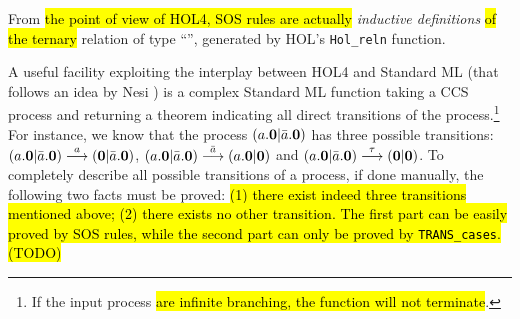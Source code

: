 From \hl{the point of view of HOL4, SOS rules are actually} \emph{inductive
  definitions} \hl{of the ternary} relation  of type ``'', generated by HOL's
\texttt{Hol_reln} function.

A useful facility exploiting the interplay
between HOL4 and Standard ML (that follows an idea by Nesi \cite{Nesi:1992ve})
 is a complex Standard ML function
  taking a CCS process and returning a theorem indicating all
  direct transitions of the process.\footnote{If the input process \hl{are
 infinite branching, the function will not terminate}.}
For instance, we know that the process $(a.{\boldsymbol 0} | \bar{a}.{\boldsymbol 0})$ has three
possible transitions: $(a.{\boldsymbol 0} | \bar{a}.{\boldsymbol 0}) \overset{a}{\longrightarrow}
({\boldsymbol 0} | \bar{a}.{\boldsymbol 0})$, $(a.{\boldsymbol 0} | \bar{a}.{\boldsymbol 0})
\overset{\bar{a}}{\longrightarrow} (a.{\boldsymbol 0} | {\boldsymbol 0})$ and $(a.{\boldsymbol 0} | \bar{a}.{\boldsymbol 0})
\overset{\tau}{\longrightarrow} ({\boldsymbol 0} | {\boldsymbol 0})$.
To completely describe all possible transitions of a process, if done manually, the
following two facts must be proved: \hl{(1) there exist indeed three
  transitions mentioned above; (2) there exists no other
  transition. The first part can be easily proved by SOS rules, while
  the second part can only be proved by \texttt{TRANS\_cases}. (TODO)}

